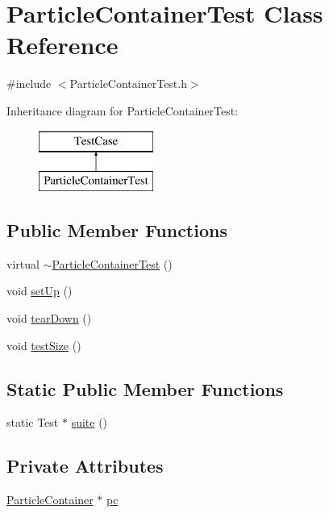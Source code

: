 \hypertarget{classParticleContainerTest}{\section{Particle\+Container\+Test Class Reference}
\label{classParticleContainerTest}
}


{\ttfamily \#include $<$Particle\+Container\+Test.\+h$>$}

Inheritance diagram for Particle\+Container\+Test\+:\begin{figure}[H]
\begin{center}
\leavevmode
\includegraphics[height=2.000000cm]{classParticleContainerTest}
\end{center}
\end{figure}
\subsection*{Public Member Functions}
\begin{DoxyCompactItemize}
\item 
virtual \hyperlink{classParticleContainerTest_a6fff30944bc8d19c2a838ac0735222fc}{$\sim$\+Particle\+Container\+Test} ()
\item 
void \hyperlink{classParticleContainerTest_a114674bf106f1237eb8e5d0afa2cead0}{set\+Up} ()
\item 
void \hyperlink{classParticleContainerTest_a3109d4eb4afad3ff4c046fc47ad4fcc4}{tear\+Down} ()
\item 
void \hyperlink{classParticleContainerTest_a51079ca20b39f6379629c6d34db08014}{test\+Size} ()
\end{DoxyCompactItemize}
\subsection*{Static Public Member Functions}
\begin{DoxyCompactItemize}
\item 
static Test $\ast$ \hyperlink{classParticleContainerTest_a38e0daa7f1ebeece1275a9b95a5a70b6}{suite} ()
\end{DoxyCompactItemize}
\subsection*{Private Attributes}
\begin{DoxyCompactItemize}
\item 
\hyperlink{classParticleContainer}{Particle\+Container} $\ast$ \hyperlink{classParticleContainerTest_abe422a5d5ec7ac984d1028f61ab85472}{pc}
\end{DoxyCompactItemize}


